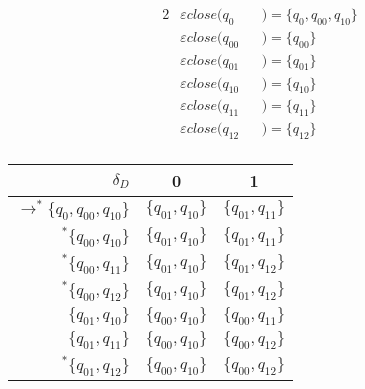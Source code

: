\documentclass[docid=2018/19]{tcom_exam}
\begin{document}
{\begin{minipage}[c]{0.49\textwidth}
\begin{center}
	\end{center}
\end{minipage}
\begin{minipage}[c]{0.49\textwidth}
	\begin{alignat*}{2}
		&\varepsilon close(q_0    && )=\{q_0,q_{00},q_{10}\}\\
		&\varepsilon close(q_{00} && )=\{q_{00}\}\\
		&\varepsilon close(q_{01} && )=\{q_{01}\}\\
		&\varepsilon close(q_{10} && )=\{q_{10}\}\\
		&\varepsilon close(q_{11} && )=\{q_{11}\}\\
		&\varepsilon close(q_{12} && )=\{q_{12}\}\\
	\end{alignat*}
\end{minipage}
\begin{minipage}[c]{0.49\textwidth}
	\begin{center}
		\begin{tabular}{r | c c}
			$\delta_D$                              & 0            & 1           \\ \hline
			$\rightarrow ^* \{q_0,q_{00},q_{10}\} $ & $\{q_{01},q_{10}\}$ & $\{q_{01},q_{11}\}$ \\
			$            ^* \{q_{00},q_{10}     \}$ & $\{q_{01},q_{10}\}$ & $\{q_{01},q_{11}\}$ \\
			$            ^* \{q_{00},q_{11}     \}$ & $\{q_{01},q_{10}\}$ & $\{q_{01},q_{12}\}$ \\
			$            ^* \{q_{00},q_{12}     \}$ & $\{q_{01},q_{10}\}$ & $\{q_{01},q_{12}\}$ \\
			$               \{q_{01},q_{10}     \}$ & $\{q_{00},q_{10}\}$ & $\{q_{00},q_{11}\}$ \\
			$               \{q_{01},q_{11}     \}$ & $\{q_{00},q_{10}\}$ & $\{q_{00},q_{12}\}$ \\
			$            ^* \{q_{01},q_{12}     \}$ & $\{q_{00},q_{10}\}$ & $\{q_{00},q_{12}\}$
		\end{tabular}
	\end{center}

\end{minipage}}
\end{document}
